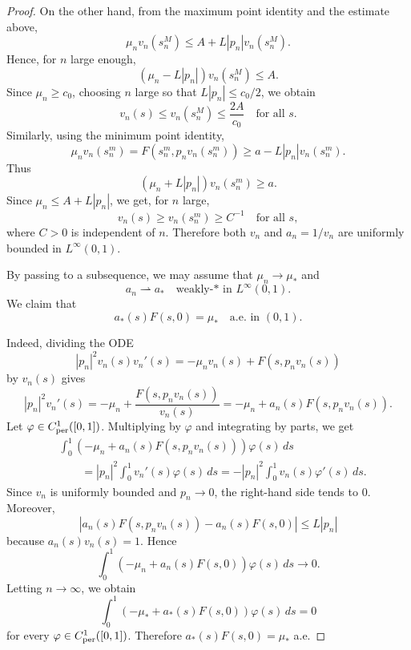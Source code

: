 \documentclass[preprint]{elsarticle}
\numberwithin{equation}{section}
\begin{document}
\begin{proof}
On the other hand, from the maximum point identity and the estimate above,
\begin{equation*}
\mu_n v_n(s_n^M)
\le
A+L|p_n|v_n(s_n^M).
\end{equation*}
Hence, for $n$ large enough,
\begin{equation*}
(\mu_n-L|p_n|)v_n(s_n^M)\le A.
\end{equation*}
Since $\mu_n\ge c_0$, choosing $n$ large so that $L|p_n|\le c_0/2$, we obtain
\begin{equation}
v_n(s)\le v_n(s_n^M)\le \frac{2A}{c_0}
\quad\text{for all }s. \label{upper bound}
\end{equation}
Similarly, using the minimum point identity,
\begin{equation*}
\mu_n v_n(s_n^m)
=
F(s_n^m,p_nv_n(s_n^m))
\ge
a-L|p_n|v_n(s_n^m).
\end{equation*}
Thus
\begin{equation*}
(\mu_n+L|p_n|)v_n(s_n^m)\ge a.
\end{equation*}
Since $\mu_n\le A+L|p_n|$, we get, for $n$ large,
\begin{equation}
v_n(s)\ge v_n(s_n^m)\ge C^{-1}
\quad\text{for all }s, \label{lower bound}
\end{equation}
where $C>0$ is independent of $n$. Therefore both $v_n$ and $a_n=1/v_n$ are uniformly bounded in $L^\infty(0,1)$.

By passing to a subsequence, we may assume that
$
\mu_n\to \mu_*
$
and
$$
a_n \rightharpoonup a_*
\quad\text{weakly-* in }L^\infty(0,1).
$$
We claim that
\begin{equation}
a_*(s)F(s,0)=\mu_*
\quad\text{a.e. in }(0,1).
\end{equation}

Indeed, dividing the ODE
$$
|p_n|^2 v_n(s)v_n'(s)
=
-\mu_n v_n(s)+F(s,p_nv_n(s))
$$
by $v_n(s)$ gives
\begin{equation*}
|p_n|^2v_n'(s)
=
-\mu_n+\frac{F(s,p_nv_n(s))}{v_n(s)}
=
-\mu_n+a_n(s)F(s,p_nv_n(s)).
\end{equation*}
Let $\varphi\in C^1_{\rm per}([0,1])$. Multiplying by $\varphi$ and integrating by parts, we get
\begin{align*}
&\int_0^1
\left(
-\mu_n+a_n(s)F(s,p_nv_n(s))
\right)
\varphi(s)\,ds
\\
&\qquad
=
|p_n|^2\int_0^1 v_n'(s)\varphi(s)\,ds
=
-|p_n|^2\int_0^1 v_n(s)\varphi'(s)\,ds.
\end{align*}
Since $v_n$ is uniformly bounded and $p_n\to0$, the right-hand side tends to $0$. Moreover,
\begin{equation*}
\left|
a_n(s)F(s,p_nv_n(s))-a_n(s)F(s,0)
\right|
\le
L|p_n|
\end{equation*}
because $a_n(s)v_n(s)=1$. Hence
\begin{equation*}
\int_0^1
\left(
-\mu_n+a_n(s)F(s,0)
\right)
\varphi(s)\,ds
\to0.
\end{equation*}
Letting $n\to\infty$, we obtain
\begin{equation*}
\int_0^1
\left(
-\mu_*+a_*(s)F(s,0)
\right)
\varphi(s)\,ds
=0
\end{equation*}
for every $\varphi\in C^1_{\rm per}([0,1])$. Therefore $a_*(s)F(s,0)=\mu_*$ a.e.


\end{proof}
\end{document}
